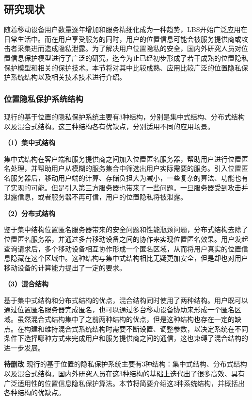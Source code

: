 \documentclass[zihao=-4]{ctexart}
\begin{document}
\subsection{研究现状}
随着移动设备用户数量逐年增加和服务精细化成为一种趋势，LBS开始广泛应用在日常生活中。而在用户享受服务的同时，用户的位置信息可能会被服务提供商或攻击者采集进而造成隐私泄露。为了解决用户位置隐私的安全，国内外研究人员对位置信息保护模型进行了广泛的研究，迄今为止已经初步形成了若干成熟的位置隐私保护模型和相关的保护技术。本节将对其中比较成熟、应用比较广泛的位置隐私保护系统结构以及相关技术技术进行介绍。

\subsubsection{位置隐私保护系统结构}
现行的基于位置的隐私保护系统主要有3种结构，分别是集中式结构、分布式结构以及混合式结构。这三种结构各有优缺点，分别适用不同的应用场景。
\par 
\textbf{（1）集中式结构}
\par 
集中式结构在客户端和服务提供商之间加入位置匿名服务器，帮助用户进行位置匿名处理，并帮助用户从模糊的服务集合中筛选出用户实际需要的服务。\cite{czh_6.1}引入位置匿名服务器后，移动用户端的计算、存储负担大为减小，一些复杂的算法、功能也有了实现的可能。但是引入第三方服务器也带来了一些问题。一旦服务器受到攻击并泄露信息，或者服务器不再可信，用户的位置隐私将被泄露。
\par 
\textbf{（2）分布式结构}
\par 
鉴于集中结构位置匿名服务器带来的安全问题和性能瓶颈问题，分布式结构去除了位置匿名服务器，并通过多台移动设备之间的协作来实现位置匿名效果。用户发起查询请求后，多个移动设备相互协作形成一个匿名区域，从而将用户真实的位置信息隐藏在这个区域中。这种结构与集中式结构相比无疑更加安全，但是却也对用户移动设备的计算能力提出了一定的要求。
\par 
\textbf{（3）混合结构}
\par 
基于集中式结构和分布式结构的优点，混合结构同时使用了两种结构。用户既可以通过位置匿名服务器完成匿名，也可以通过多台移动设备协助来形成一个匿名区域。虽然混合式结构集中了之前两种结构的优点，但是这种结构也存在一定的缺点。在构建和维持混合式系统结构时需要不断设置、调整参数\cite{czh_6.2}，以决定系统在不同条件下选择哪种方式来完成用户和服务提供商之间的通信，这也束缚了混合结构的进一步发展。

\iffalse
\textbf{待删改}
现行的基于位置的隐私保护系统主要有3种结构：集中式结构、分布式结构以及混合式结构。国内外研究人员在这3种结构的基础上迭代出了很多高效、具有广泛适用性的位置信息隐私保护算法。本节将简要介绍这3种系统结构，并概括出各种结构的优缺点。
\end{document}
